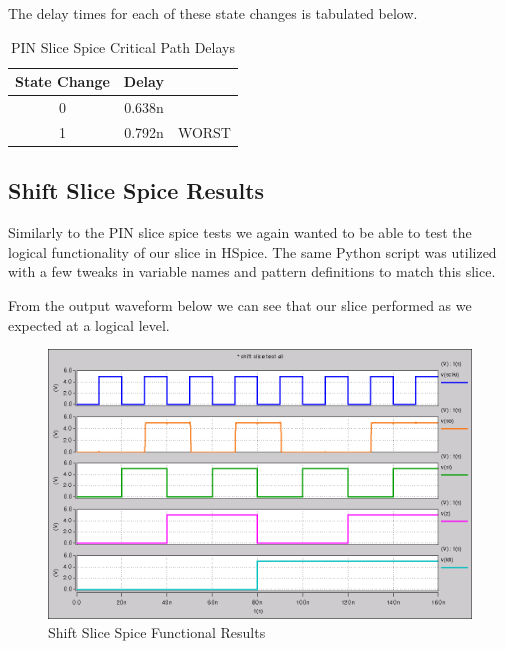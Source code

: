         \vspace{\baselineskip}
        The delay times for each of these state changes is tabulated below.

        \begin{table}[H]
            \centering
            \begin{tabular}{crc}
                \toprule
                \textbf{State Change} & \textbf{Delay} & \\
                \midrule
                0 & 0.638n & \\
                1 & 0.792n & WORST \\
                \bottomrule
            \end{tabular}
            \caption{PIN Slice Spice Critical Path Delays}
        \end{table}

    \newpage

    \subsection{Shift Slice Spice Results}

        Similarly to the PIN slice spice tests we again wanted to be able to
        test the logical functionality of our slice in HSpice. The same Python
        script was utilized with a few tweaks in variable names and pattern
        definitions to match this slice.

        

        From the output waveform below we can see that our slice performed as
        we expected at a logical level.

        \begin{figure}[H]
            \centering
            \includegraphics[width=0.75\linewidth]{../../spice/shift_slice_all.png}
            \caption{Shift Slice Spice Functional Results}
        \end{figure}

